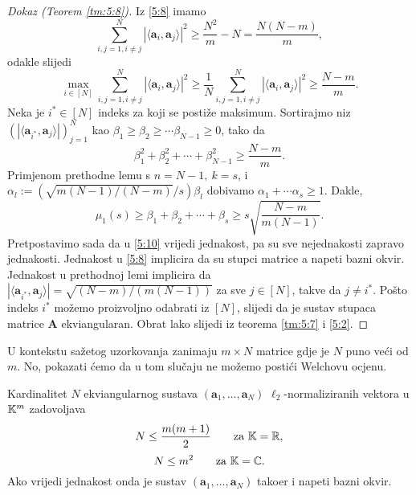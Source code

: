 \documentclass[a4paper,twoside,12pt]{memoir} %
\newcommand{\vect}[1]{\mathbf{#1}}
\renewcommand{\vec}{\vect}
\begin{document}
\begin{proof}[Dokaz (Teorem \ref{tm:5:8})]
    Iz \eqref{5:8} imamo 
    \begin{equation*}
        \sum_{i,j=1,i \neq j}^N |\langle \vec a_i, \vec a_j \rangle|^2 \geq \frac{N^2}{m} - N = \frac{N(N-m)}{m},
    \end{equation*}
    odakle slijedi
    \begin{equation*}
        \max_{i \in [N]} \sum_{i,j=1,i \neq j}^N |\langle \vec a_i, \vec a_j \rangle|^2 \geq \frac{1}{N} \sum_{i,j=1,i \neq j}^N |\langle \vec a_i, \vec a_j \rangle|^2 \geq \frac{N-m}{m} .
    \end{equation*}
    Neka je $i^* \in [N]$ indeks za koji se posti\v{z}e maksimum. Sortirajmo niz $(|\langle \vec a_{i^*}, \vec a_j \rangle|)_{j=1}^{N}$ kao $\beta_1 \geq \beta_2 \geq \cdots \beta_{N-1} \geq 0$, tako da
    \begin{equation*}
        \beta_1^2 + \beta_2^2 + \cdots + \beta_{N-1}^2 \geq \frac{N-m}{m} .
    \end{equation*}
    Primjenom prethodne lemu s $n = N-1,\ k = s$, i $\alpha_l := (\sqrt{m(N-1)/(N-m)}/s)\beta_l$ dobivamo $\alpha_1 + \cdots \alpha_s \geq 1$. Dakle,
    \begin{equation*}
        \mu_1(s) \geq \beta_1 + \beta_2 + \cdots + \beta_s \geq s \sqrt{\frac{N-m}{m(N-1)}}.
    \end{equation*}
    Pretpostavimo sada da u \eqref{5:10} vrijedi jednakost, pa su sve nejednakosti zapravo jednakosti. Jednakost u \eqref{5:8} implicira da su stupci matrice a napeti bazni okvir. Jednakost u prethodnoj lemi implicira da $|\langle \vec a_{i^*}, \vec a_j \rangle| = \sqrt{(N-m)/(m(N-1))}$ za sve $j \in [N]$, takve da $j \neq i^*$. Po\v{s}to indeks $i^*$ mo\v{z}emo proizvoljno odabrati iz $[N]$, slijedi da je sustav stupaca matrice $\vec A$ ekviangularan. Obrat lako slijedi iz teorema \ref{tm:5:7} i \eqref{5:2}.
\end{proof}

U kontekstu sa\v{z}etog uzorkovanja zanimaju $m \times N$ matrice gdje je $N$ puno ve\'ci od $m$. No, pokazati \'cemo da u tom slu\v{c}aju ne mo\v{z}emo posti\'ci Welchovu ocjenu.
\begin{thm}\label{5:10}
    Kardinalitet $N$ ekviangularnog sustava $(\vec a_1, \dots, \vec a_N)$ $\ell_2$-normaliziranih vektora u $\mathbb{K}^m$ zadovoljava
    \begin{equation*}
        N \leq \frac{m(m+1)}{2} \quad \quad \text{za } \mathbb{K} = \mathbb{R}, 
    \end{equation*}
    \begin{equation*}
        N \leq m^2 \quad \quad \text{za } \mathbb{K} = \mathbb{C}.
    \end{equation*}
    Ako vrijedi jednakost onda je sustav $(\vec a_1, \dots, \vec a_N)$ tako\dj er i napeti bazni okvir.
\end{thm}
\end{document}
